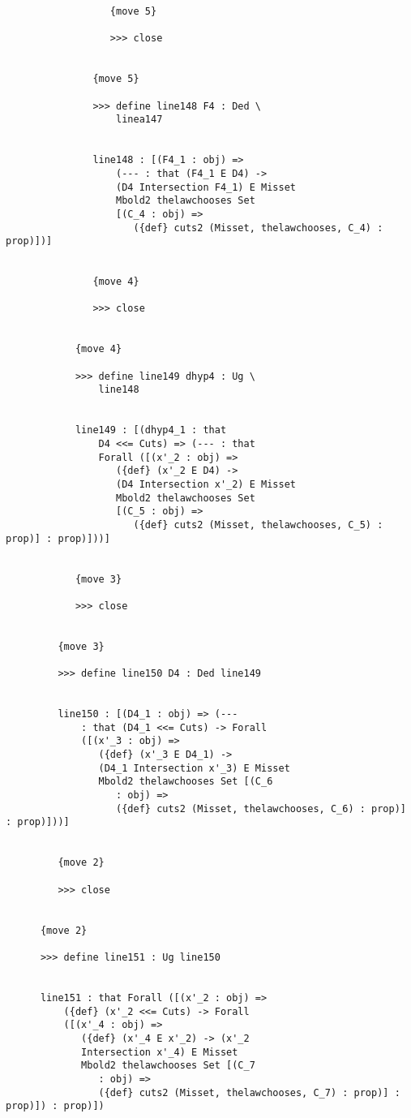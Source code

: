 \documentclass[12pt]{article}
\begin{document}
\begin{verbatim}
                  {move 5}

                  >>> close


               {move 5}

               >>> define line148 F4 : Ded \
                   linea147


               line148 : [(F4_1 : obj) => 
                   (--- : that (F4_1 E D4) -> 
                   (D4 Intersection F4_1) E Misset 
                   Mbold2 thelawchooses Set 
                   [(C_4 : obj) => 
                      ({def} cuts2 (Misset, thelawchooses, C_4) : prop)])]


               {move 4}

               >>> close


            {move 4}

            >>> define line149 dhyp4 : Ug \
                line148


            line149 : [(dhyp4_1 : that 
                D4 <<= Cuts) => (--- : that 
                Forall ([(x'_2 : obj) => 
                   ({def} (x'_2 E D4) -> 
                   (D4 Intersection x'_2) E Misset 
                   Mbold2 thelawchooses Set 
                   [(C_5 : obj) => 
                      ({def} cuts2 (Misset, thelawchooses, C_5) : prop)] : prop)]))]


            {move 3}

            >>> close


         {move 3}

         >>> define line150 D4 : Ded line149


         line150 : [(D4_1 : obj) => (--- 
             : that (D4_1 <<= Cuts) -> Forall 
             ([(x'_3 : obj) => 
                ({def} (x'_3 E D4_1) -> 
                (D4_1 Intersection x'_3) E Misset 
                Mbold2 thelawchooses Set [(C_6 
                   : obj) => 
                   ({def} cuts2 (Misset, thelawchooses, C_6) : prop)] : prop)]))]


         {move 2}

         >>> close


      {move 2}

      >>> define line151 : Ug line150


      line151 : that Forall ([(x'_2 : obj) => 
          ({def} (x'_2 <<= Cuts) -> Forall 
          ([(x'_4 : obj) => 
             ({def} (x'_4 E x'_2) -> (x'_2 
             Intersection x'_4) E Misset 
             Mbold2 thelawchooses Set [(C_7 
                : obj) => 
                ({def} cuts2 (Misset, thelawchooses, C_7) : prop)] : prop)]) : prop)])



\end{verbatim}
\end{document}
